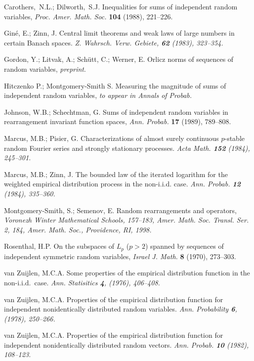 \documentclass[12pt]{amsart}
\begin{document}
\begin{thebibliography}{999}

Carothers,~N.L.; Dilworth,~S.J. Inequalities for sums
of
independent random variables, {\em Proc. Amer. Math. Soc.} {\bf 104} (1988),
221--226.

Gin\'e, E.; Zinn, J. 
Central limit theorems and weak laws of large numbers in certain Banach spaces. 
{\em Z. Wahrsch. Verw. Gebiete, {\bf 62} (1983), 323--354.}

Gordon, Y.; Litvak, A.; Sch\"utt, C.; Werner, E.
Orlicz norms of sequences of random variables,
{\em preprint}.

Hitczenko P.; Montgomery-Smith S. 
Measuring the magnitude of sums of independent random variables,
{\em to appear in Annals of Probab.}

Johnson, W.B.; Schechtman, G. Sums of independent
random variables in rearrangement invariant function spaces, {\em
Ann. Probab.} {\bf 17} (1989), 789--808.

Marcus, M.B.; Pisier, G. 
Characterizations of almost surely continuous $p$-stable random Fourier 
series and strongly stationary processes.
{\em Acta Math. {\bf 152} (1984), 245--301.}

Marcus, M.B.; Zinn, J. 
The bounded law of the iterated logarithm for the weighted empirical 
distribution process in the non-i.i.d.
case. 
{\em Ann. Probab. {\bf 12} (1984), 335--360.}

Montgomery-Smith, S.; Semenov, E. 
Random rearrangements and operators, 
{\em Voronezh Winter Mathematical Schools,
157--183, Amer. Math. Soc. Transl. Ser. 2, 184, 
Amer. Math. Soc., Providence, RI, 1998.}

 Rosenthal, H.P. On the subspaces of $L_p$ 
($p > 2$) spanned by
sequences of independent symmetric random variables, {\em Israel
J. Math.} {\bf 8} (1970), 273--303.

van Zuijlen, M.C.A. 
Some properties of the empirical distribution function in the non-i.i.d.\
case.
{\em Ann. Statisitics {\bf 4}, (1976), 406--408.}

van Zuijlen, M.C.A. 
Properties of the empirical distribution function for independent 
nonidentically distributed random variables.
{\em Ann. Probability {\bf 6}, (1978), 250--266.}

van Zuijlen, M.C.A. 
Properties of the empirical distribution function for independent 
nonidentically distributed random vectors. 
{\em Ann. Probab. {\bf 10} (1982), 108--123.}

\end{thebibliography}
\end{document}
